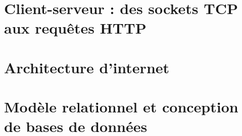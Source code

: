 \chapter{Client-serveur : des sockets TCP aux requêtes HTTP} \label{L25}


\chapter{Architecture d'internet} \label{L26}


\chapter{Modèle relationnel et conception de bases de données} \label{L27}


%
 


